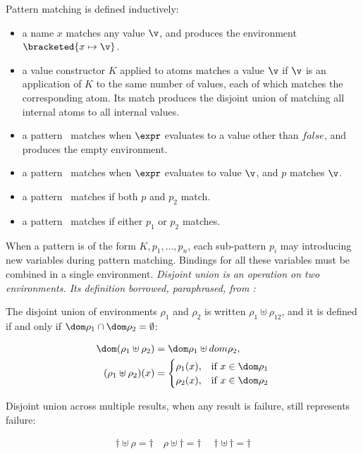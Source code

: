 \documentclass[manuscript,screen,review, 12pt, nonacm]{acmart}
\begin{document}
Pattern matching is defined inductively: 
\begin{itemize}
    \item a name $x$ matches any value $\v$, and produces the environment 
    $\bracketed{x \mapsto \v}$. 
    \item a value constructor $K$ applied to atoms  matches 
    a value $\v$ if $\v$ is an application of $K$ to the same number of values,
    each of which matches the corresponding atom. Its match produces 
    the disjoint union of matching all internal atoms to all internal values. 
    \item a pattern \whenexpr\ matches when $\expr$ evaluates to a value other than 
    $\mathit{false}$, and produces the empty environment. 
    \item a pattern \parrowe\ matches when $\expr$ evaluates to 
          value $\v$, and $p$ matches $\v$. 
    \item a pattern \pcommap\ matches if both $p$ and $p_{2}$ match.
    \item a pattern \porp\ matches if either $p_{1}$ or $p_{2}$
    matches. 
\end{itemize}

When a pattern is of the form $K, p_{1}, \dots, p_{n}$, each sub-pattern $p_{i}$
may introducing new variables during pattern matching. Bindings for all these
variables must be combined in a single environment. \it{Disjoint union} is an
operation on two environments. Its definition borrowed, paraphrased, from
\citet{bpc}: 

The disjoint union of environments $\rho_{1}$ and $\rho_{2}$ is written
$\rho_{1} \uplus \rho_{12}$, and it is defined if and only if $\dom \rho_{1}
\cap \dom \rho_{2} = \emptyset$:

\begin{align*}
  \dom(\rho_{1} \uplus \rho_{2}) &= \dom \rho_{1} \uplus dom \rho_{2}, \\
    (\rho_{1} \uplus \rho_{2})(x) &= 
  \begin{cases}
    \rho_{1}(x), & \text{if } x \in \dom  \rho_{1} \\
    \rho_{2}(x), & \text{if } x \in \dom \rho_{2} \\
\end{cases}
\end{align*}

Disjoint union across multiple results, when any result is failure, still
represents failure: 

\begin{gather*}
  \dagger \uplus \rho = \dagger \quad
  \rho \uplus \dagger = \dagger \quad
  \dagger \uplus\, \dagger = \dagger
\end{gather*}
\end{document}
